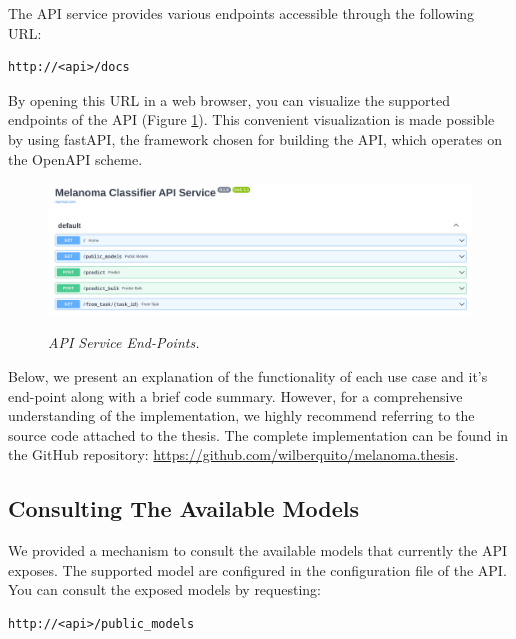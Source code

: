 The API service provides various endpoints accessible through the following URL:

\begin{Verbatim}[fontsize=\scriptsize]
http://<api>/docs
\end{Verbatim}

By opening this URL in a web browser, you can visualize the supported endpoints of the API
(Figure \ref{fig:api-endpoints}). This convenient visualization is made possible by using fastAPI,
the framework chosen for building the API, which operates on the OpenAPI scheme.

\begin{figure}[H]
  \centering
  \begin{adjustbox}{width=\textwidth, trim={0.2cm 0cm 0.1cm 0cm}, clip}
    \includegraphics[width=\textwidth]{imatges/results/api-endpoints.png}
  \end{adjustbox}
  \caption[API Service End-Points]{\textit{API Service End-Points. }}
  {\label{fig:api-endpoints}}
\end{figure}

Below, we present an explanation of the functionality of each use case and it's
end-point along with a brief code summary. However, for a comprehensive
understanding of the implementation, we highly recommend referring to the
source code attached to the thesis. The complete implementation can be found in
the GitHub repository: \url{https://github.com/wilberquito/melanoma.thesis}.

\subsection{Consulting The Available Models}

We provided a mechanism to consult the available models that currently the API
exposes. The supported model are configured in the configuration file of the
API. \\

You can consult the exposed models by requesting:

\begin{Verbatim}[fontsize=\scriptsize]
http://<api>/public_models
\end{Verbatim}

